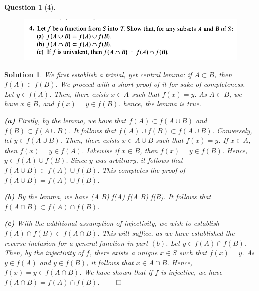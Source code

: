 \documentclass{article} %
\def\eQb#1\eQe{\begin{eqnarray*}#1\end{eqnarray*}}
\theoremstyle{quest}
\newtheorem*{question}{Question}
\newtheorem*{solution}{Solution}
\begin{document}
\begin{question}[4]
\hfill
\begin{figure}[h!]
  \centering
    \includegraphics[width=1\textwidth]{MV-2-1-4.png}
\end{figure}
\end{question}
\begin{solution}
We first establish a trivial, yet central lemma: if $A \subset B$, then $f(A) \subset f(B)$.
We proceed with a short proof of it for sake of completeness.  
Let $y \in f(A)$. Then, there exists $x \in A$ such that $f(x) = y$. As $A \subset B$, 
we have $x \in B$, and $f(x) = y \in f(B)$. hence, the lemma is true.

\textbf{(a)}
Firstly, by the lemma, we have that $f(A) \subset f(A \cup B)$ and $f(B) \subset f(A \cup B)$.
It follows that $f(A) \cup f(B) \subset f(A \cup B)$. Conversely, 
let $y \in f(A \cup B)$. Then, there exists $x \in A \cup B$ such that $f(x) = y$. 
If $x \in A$, then $f(x) = y \in f(A)$. Likewise if $x \in B$, then $f(x) = y \in f(B)$. Hence,
$y \in f(A) \cup f(B)$. Since $y$ was arbitrary, it follows that $f(A \cup B) \subset 
f(A) \cup f(B)$. 
This completes
the proof of $f(A \cup B) = f(A) \cup f(B)$.  

\bigskip

\textbf{(b)} By the lemma, we have
\eQb
f(A \cap B) \subset f(A) \> \>  \> \> f(A \cap B) \subset f(B).
\eQe 
It follows that $f(A \cap B) \subset f(A) \cap f(B)$. 

\bigskip

\textbf{(c)} With the additional assumption of injectivity, we wish to establish 
$f(A) \cap f(B) \subset  f(A \cap B)$. This will suffice, as we have established the reverse
inclusion for a general function in part $(b)$. Let $y \in f(A) \cap f(B)$. Then, by the
injectivity of $f$, there exists a unique $x \in S$ such that $f(x) = y$. As $y \in f(A)$ and
$y \in f(B)$, it follows that $x \in A \cap B$. Hence, $f(x) = y \in f(A \cap B)$. We have shown 
that if $f$ is injective, we have $f(A \cap B)  = f(A) \cap f(B)$.
\hfill $\qed$ 
   
  
\end{solution}

\newpage
\end{document}
